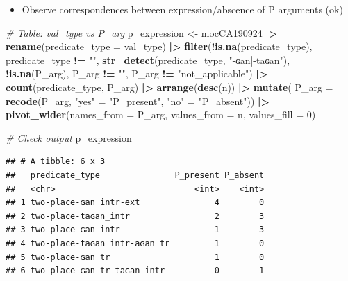 \documentclass[
]{article}
\newenvironment{Shaded}{\begin{snugshade}}{\end{snugshade}}
\newcommand{\AttributeTok}[1]{\textcolor[rgb]{0.13,0.29,0.53}{#1}}
\newcommand{\CommentTok}[1]{\textcolor[rgb]{0.56,0.35,0.01}{\textit{#1}}}
\newcommand{\DecValTok}[1]{\textcolor[rgb]{0.00,0.00,0.81}{#1}}
\newcommand{\FunctionTok}[1]{\textcolor[rgb]{0.13,0.29,0.53}{\textbf{#1}}}
\newcommand{\NormalTok}[1]{#1}
\newcommand{\OtherTok}[1]{\textcolor[rgb]{0.56,0.35,0.01}{#1}}
\newcommand{\SpecialCharTok}[1]{\textcolor[rgb]{0.81,0.36,0.00}{\textbf{#1}}}
\newcommand{\StringTok}[1]{\textcolor[rgb]{0.31,0.60,0.02}{#1}}
\providecommand{\tightlist}{%
  \setlength{\itemsep}{0pt}\setlength{\parskip}{0pt}}
\begin{document}
\begin{itemize}
\tightlist
\item
  Observe correspondences between expression/abscence of P arguments
  (ok)
\end{itemize}

\begin{Shaded}
\begin{Highlighting}[]
\CommentTok{\# Table: val\_type vs P\_arg}
\NormalTok{p\_expression }\OtherTok{\textless{}{-}}\NormalTok{ mocCA190924 }\SpecialCharTok{|\textgreater{}} 
   \FunctionTok{rename}\NormalTok{(}\AttributeTok{predicate\_type =}\NormalTok{ val\_type) }\SpecialCharTok{|\textgreater{}} 
  \FunctionTok{filter}\NormalTok{(}\SpecialCharTok{!}\FunctionTok{is.na}\NormalTok{(predicate\_type), predicate\_type }\SpecialCharTok{!=} \StringTok{""}\NormalTok{, }\FunctionTok{str\_detect}\NormalTok{(predicate\_type, }\StringTok{"{-}ɢan|{-}taɢan"}\NormalTok{),}
         \SpecialCharTok{!}\FunctionTok{is.na}\NormalTok{(P\_arg), P\_arg }\SpecialCharTok{!=} \StringTok{""}\NormalTok{, P\_arg }\SpecialCharTok{!=} \StringTok{"not\_applicable"}\NormalTok{) }\SpecialCharTok{|\textgreater{}} 
  \FunctionTok{count}\NormalTok{(predicate\_type, P\_arg) }\SpecialCharTok{|\textgreater{}} 
  \FunctionTok{arrange}\NormalTok{(}\FunctionTok{desc}\NormalTok{(n)) }\SpecialCharTok{|\textgreater{}}
 \FunctionTok{mutate}\NormalTok{( }\AttributeTok{P\_arg =} \FunctionTok{recode}\NormalTok{(P\_arg,}
      \StringTok{"yes"}            \OtherTok{=} \StringTok{"P\_present"}\NormalTok{,}
     \StringTok{"no"}             \OtherTok{=} \StringTok{"P\_absent"}\NormalTok{)) }\SpecialCharTok{|\textgreater{}} 
  \FunctionTok{pivot\_wider}\NormalTok{(}\AttributeTok{names\_from =}\NormalTok{ P\_arg, }\AttributeTok{values\_from =}\NormalTok{ n, }\AttributeTok{values\_fill =} \DecValTok{0}\NormalTok{)}

\CommentTok{\# Check output }
\NormalTok{ p\_expression}
\end{Highlighting}
\end{Shaded}

\begin{verbatim}
## # A tibble: 6 x 3
##   predicate_type               P_present P_absent
##   <chr>                            <int>    <int>
## 1 two-place-ɢan_intr-ext               4        0
## 2 two-place-taɢan_intr                 2        3
## 3 two-place-ɢan_intr                   1        3
## 4 two-place-taɢan_intr-aɢan_tr         1        0
## 5 two-place-ɢan_tr                     1        0
## 6 two-place-ɢan_tr-taɢan_intr          0        1
\end{verbatim}
\end{document}
